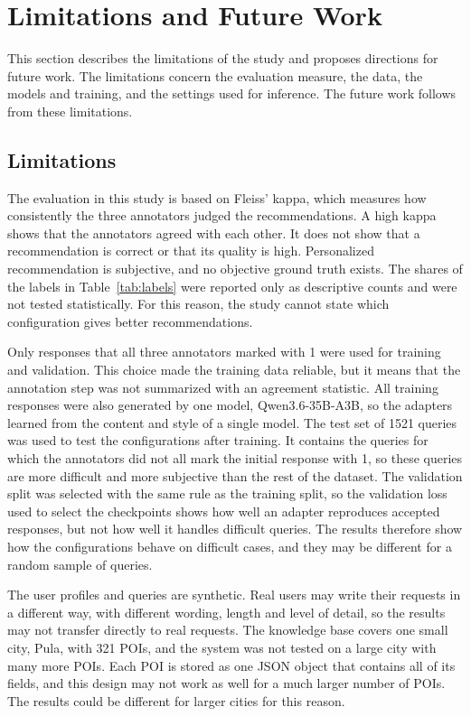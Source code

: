 \documentclass[journal,article,submit,pdftex,moreauthors]{Definitions/mdpi}
\begin{document}
\section{Limitations and Future Work}\label{sec:limitations}

This section describes the limitations of the study and proposes directions for future work. The limitations concern the evaluation measure, the data, the models and training, and the settings used for inference. The future work follows from these limitations.

\subsection{Limitations}
The evaluation in this study is based on Fleiss' kappa, which measures how consistently the three annotators judged the recommendations. A high kappa shows that the annotators agreed with each other. It does not show that a recommendation is correct or that its quality is high. Personalized recommendation is subjective, and no objective ground truth exists. The shares of the labels in Table~\ref{tab:labels} were reported only as descriptive counts and were not tested statistically. For this reason, the study cannot state which configuration gives better recommendations.

Only responses that all three annotators marked with 1 were used for training and validation. This choice made the training data reliable, but it means that the annotation step was not summarized with an agreement statistic. All training responses were also generated by one model, Qwen3.6-35B-A3B, so the adapters learned from the content and style of a single model. The test set of 1521 queries was used to test the configurations after training. It contains the queries for which the annotators did not all mark the initial response with 1, so these queries are more difficult and more subjective than the rest of the dataset. The validation split was selected with the same rule as the training split, so the validation loss used to select the checkpoints shows how well an adapter reproduces accepted responses, but not how well it handles difficult queries. The results therefore show how the configurations behave on difficult cases, and they may be different for a random sample of queries.

The user profiles and queries are synthetic. Real users may write their requests in a different way, with different wording, length and level of detail, so the results may not transfer directly to real requests. The knowledge base covers one small city, Pula, with 321 POIs, and the system was not tested on a large city with many more POIs. Each POI is stored as one JSON object that contains all of its fields, and this design may not work as well for a much larger number of POIs. The results could be different for larger cities for this reason.
\end{document}

